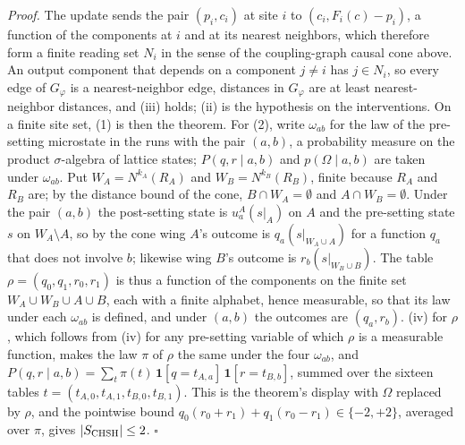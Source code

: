 \documentclass[
]{article}
\begin{document}
\emph{Proof.} The update sends the pair \((p_i,c_i)\) at site \(i\) to
\((c_i,F_i(c)-p_i)\), a function of the components at \(i\) and at its
nearest neighbors, which therefore form a finite reading set \(N_i\) in
the sense of the coupling-graph causal cone above. An output component
that depends on a component \(j\neq i\) has \(j\in N_i\), so every edge
of \(G_\varphi\) is a nearest-neighbor edge, distances in \(G_\varphi\)
are at least nearest-neighbor distances, and (iii) holds; (ii) is the
hypothesis on the interventions. On a finite site set, (1) is then the
theorem. For (2), write \(\omega_{ab}\) for the law of the pre-setting
microstate in the runs with the pair \((a,b)\), a probability measure on
the product \(\sigma\)-algebra of lattice states; \(P(q,r\mid a,b)\) and
\(p(\Omega\mid a,b)\) are taken under \(\omega_{ab}\). Put
\(W_A=N^{k_A}(R_A)\) and \(W_B=N^{k_B}(R_B)\), finite because \(R_A\)
and \(R_B\) are; by the distance bound of the cone,
\(B\cap W_A=\emptyset\) and \(A\cap W_B=\emptyset\). Under the pair
\((a,b)\) the post-setting state is \(u^A_a(s|_A)\) on \(A\) and the
pre-setting state \(s\) on \(W_A\setminus A\), so by the cone wing
\(A\)'s outcome is \(q_a(s|_{W_A\cup A})\) for a function \(q_a\) that
does not involve \(b\); likewise wing \(B\)'s outcome is
\(r_b(s|_{W_B\cup B})\). The table \(\rho=(q_0,q_1,r_0,r_1)\) is thus a
function of the components on the finite set
\(W_A\cup W_B\cup A\cup B\), each with a finite alphabet, hence
measurable, so that its law under each \(\omega_{ab}\) is defined, and
under \((a,b)\) the outcomes are \((q_a,r_b)\). (iv) for \(\rho\), which
follows from (iv) for any pre-setting variable of which \(\rho\) is a
measurable function, makes the law \(\pi\) of \(\rho\) the same under
the four \(\omega_{ab}\), and
\(P(q,r\mid a,b)=\sum_t\pi(t)\,\mathbf 1[q=t_{A,a}]\,\mathbf 1[r=t_{B,b}]\),
summed over the sixteen tables \(t=(t_{A,0},t_{A,1},t_{B,0},t_{B,1})\).
This is the theorem's display with \(\Omega\) replaced by \(\rho\), and
the pointwise bound \(q_0(r_0+r_1)+q_1(r_0-r_1)\in\{-2,+2\}\), averaged
over \(\pi\), gives \(|S_{\rm CHSH}|\le2\). \(\square\)
\end{document}
